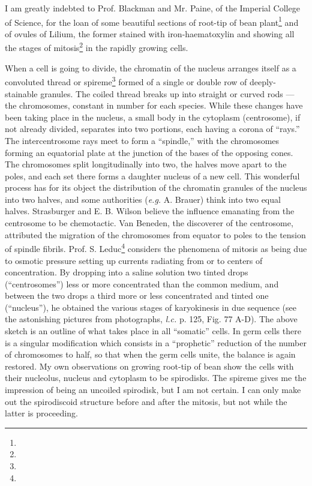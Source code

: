 \documentclass[a4paper, 12pt, oneside]{article}
\begin{document}
I am greatly indebted to Prof. Blackman and Mr. Paine, of the Imperial College of Science, for the loan of some beautiful sections of root-tip of bean plant\footnote{} and of ovules of Lilium, the former stained with iron-haematoxylin and showing all the stages of mitosis\footnote{} in the rapidly growing cells.

When a cell is going to divide, the chromatin of the nucleus arranges itself as a convoluted thread or spireme\footnote{} formed of a single or double row of deeply-stainable granules. The coiled thread breaks up into straight or curved rods --- the chromosomes, constant in number for each species. While these changes have been taking place in the nucleus, a small body in the cytoplasm (centrosome), if not already divided, separates into two portions, each having a corona of ``rays.'' The intercentrosome rays meet to form a ``spindle,'' with the chromosomes forming an equatorial plate at the junction of the bases of the opposing cones. The chromosomes split longitudinally into two, the halves move apart to the poles, and each set there forms a daughter nucleus of a new cell. This wonderful process has for its object the distribution of the chromatin granules of the nucleus into two halves, and some authorities (\emph{e.g.} A. Brauer) think into two equal halves. Strasburger and E. B. Wilson believe the influence emanating from the centrosome to be chemotactic. Van Beneden, the discoverer of the centrosome, attributed the migration of the chromosomes from equator to poles to the tension of spindle fibrils. Prof. S. Leduc\footnote{} considers the phenomena of mitosis as being due to osmotic pressure setting up currents radiating from or to centers of concentration. By dropping into a saline solution two tinted drops (``centrosomes'') less or more concentrated than the common medium, and between the two drops a third more or less concentrated and tinted one (``nucleus''), he obtained the various stages of karyokinesis in due sequence (see the astonishing pictures from photographs, \emph{l.c.} p. 125, Fig. 77 A-D). The above sketch is an outline of what takes place in all ``somatic'' cells. In germ cells there is a singular modification which consists in a ``prophetic'' reduction of the number of chromosomes to half, so that when the germ cells unite, the balance is again restored. My own observations on growing root-tip of bean show the cells with their nucleolus, nucleus and cytoplasm to be spirodisks. The spireme gives me the impression of being an uncoiled spirodisk, but I am not certain. I can only make out the spirodiscoid structure before and after the mitosis, but not while the latter is proceeding.
\end{document}
